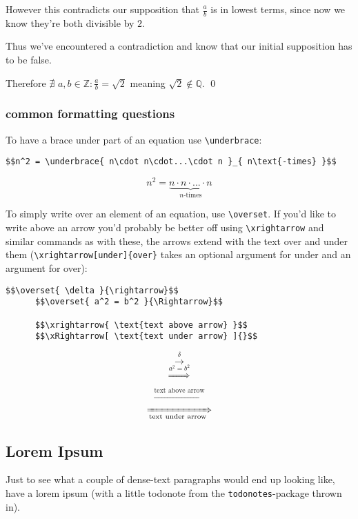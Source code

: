 \documentclass{article}
\begin{document}
    However this contradicts our supposition that $\frac{a}{b}$ is in lowest
    terms, since now we know they're both divisible by $2$. 

    Thus we've encountered a contradiction and know that our initial
    supposition has to be false. 

    Therefore $\nexists \,\, a,b\in\mathbb{Z} : \frac{a}{b} = \sqrt{2}$ meaning
    $\sqrt{2} \not\in \mathbb{Q}$. 
    \qed

  \subsubsection{common formatting questions}
    To have a brace under part of an equation use \verb|\underbrace|:  
    \begin{lstlisting}[style=LaTeX]
      $$n^2 = \underbrace{ n\cdot n\cdot...\cdot n }_{ n\text{-times} }$$
    \end{lstlisting}
      $$n^2 = \underbrace{ n\cdot n\cdot...\cdot n }_{ n\text{-times} }$$

    To simply write over an element of an equation, use \verb|\overset|. 
    If you'd like to write above an arrow you'd probably be better off using
    \verb|\xrightarrow| and similar commands as with these, the arrows extend
    with the text over and under them (\verb|\xrightarrow[under]{over}| takes
    an optional argument for under and an argument for over): 
    \begin{lstlisting}[style=LaTeX]
      $$\overset{ \delta }{\rightarrow}$$
      $$\overset{ a^2 = b^2 }{\Rightarrow}$$

      $$\xrightarrow{ \text{text above arrow} }$$
      $$\xRightarrow[ \text{text under arrow} ]{}$$
    \end{lstlisting}
      $$\overset{ \delta }{\rightarrow}$$
      $$\overset{ a^2 = b^2 }{\Rightarrow}$$

      $$\xrightarrow{ \text{text above arrow} }$$
      $$\xRightarrow[ \text{text under arrow} ]{}$$


  \subsection{Lorem Ipsum}
  Just to see what a couple of dense-text paragraphs would end up looking
  like, have a lorem ipsum (with a little todonote from the
  \texttt{todonotes}-package thrown in). 
\end{document}
